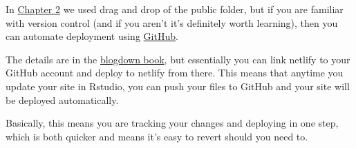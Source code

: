 \documentclass[12pt,]{book}
\theoremstyle{definition}
\theoremstyle{definition}
\theoremstyle{definition}
\theoremstyle{remark}
\begin{document}
In \protect\hyperlink{deployment}{Chapter 2} we used drag and drop of
the public folder, but if you are familiar with version control (and if
you aren't it's definitely worth learning), then you can automate
deployment using \href{https://github.com}{GitHub}.

The details are in the
\href{https://bookdown.org/yihui/blogdown/netlify.html}{blogdown book},
but essentially you can link netlify to your GitHub account and deploy
to netlify from there. This means that anytime you update your site in
Rstudio, you can push your files to GitHub and your site will be
deployed automatically.

Basically, this means you are tracking your changes and deploying in one
step, which is both quicker and means it's easy to revert should you
need to.


\end{document}
